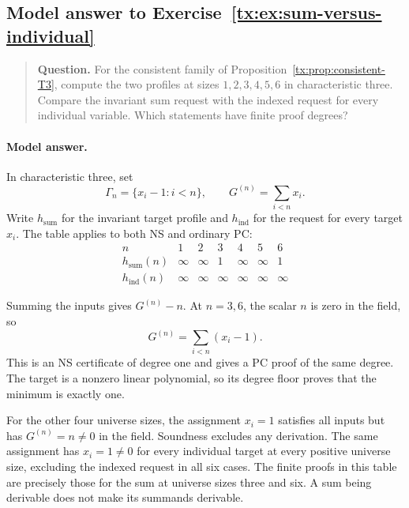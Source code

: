 \begin{samepage}

\subsection*{Model answer to Exercise~\ref{tx:ex:sum-versus-individual}}\label{tx:ans:sum-versus-individual}

\begin{quote}\small\textbf{Question.} For the consistent family of Proposition~\ref{tx:prop:consistent-T3},
compute the two profiles at sizes $1,2,3,4,5,6$ in characteristic three.
Compare the invariant sum request with the indexed request for every
individual variable. Which statements have finite proof degrees?
\end{quote}

\paragraph{Model answer.}
In characteristic three, set
\[
 \Gamma_n=\{x_i-1:i<n\},\qquad G^{(n)}=\sum_{i<n}x_i.
\]
Write \(h_{\mathrm{sum}}\) for the invariant target profile and
\(h_{\mathrm{ind}}\) for the request for every target \(x_i\).
The table applies to both NS and ordinary PC:
\[
 \begin{array}{c|cccccc}
 n&1&2&3&4&5&6\\ \hline
 h_{\mathrm{sum}}(n)&\infty&\infty&1&\infty&\infty&1\\
 h_{\mathrm{ind}}(n)&\infty&\infty&\infty&\infty&\infty&\infty
 \end{array}
\]
\end{samepage}

Summing the inputs gives \(G^{(n)}-n\). At \(n=3,6\), the scalar \(n\)
is zero in the field, so
\[
                            G^{(n)}=\sum_{i<n}(x_i-1).
\]
This is an NS certificate of degree one and gives a PC proof of
the same degree. The target is a nonzero linear polynomial, so its
degree floor proves that the minimum is exactly one.

For the other four universe sizes, the assignment \(x_i=1\) satisfies all
inputs but has \(G^{(n)}=n\ne0\) in the field. Soundness excludes any
derivation. The same assignment has \(x_i=1\ne0\) for every
individual target at every positive universe size, excluding the indexed
request in all six cases.
The finite proofs in this table are precisely those for the sum at
universe sizes three and six. A sum being derivable does not make its summands derivable.


